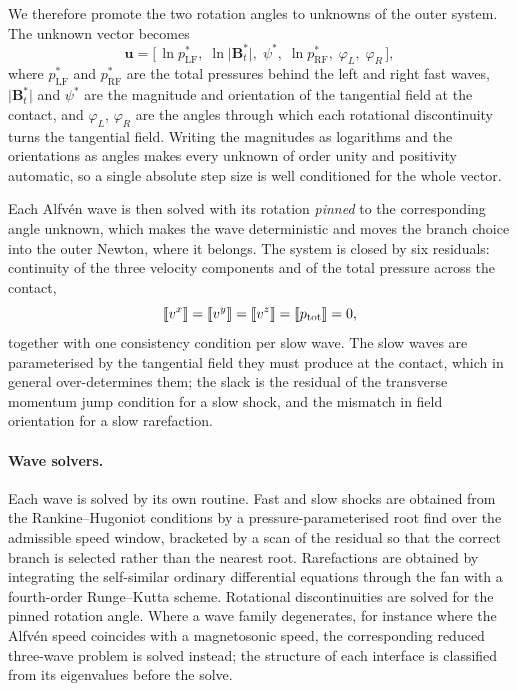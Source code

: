 We therefore promote the two rotation angles to unknowns of the outer system.
The unknown vector becomes
%
\begin{equation}
  \mathbf{u} = \bigl[\,\ln p^\ast_{\mathrm{LF}},\;
                      \ln \lvert \mathbf{B}_t^\ast \rvert,\;
                      \psi^\ast,\;
                      \ln p^\ast_{\mathrm{RF}},\;
                      \varphi_L,\; \varphi_R \,\bigr],
  \label{eq:unk6}
\end{equation}
%
where $p^\ast_{\mathrm{LF}}$ and $p^\ast_{\mathrm{RF}}$ are the total
pressures behind the left and right fast waves, $\lvert\mathbf{B}_t^\ast\rvert$
and $\psi^\ast$ are the magnitude and orientation of the tangential field at
the contact, and $\varphi_L$, $\varphi_R$ are the angles through which each
rotational discontinuity turns the tangential field. Writing the magnitudes as
logarithms and the orientations as angles makes every unknown of order unity
and positivity automatic, so a single absolute step size is well conditioned
for the whole vector.

Each Alfv\'en wave is then solved with its rotation \emph{pinned} to the
corresponding angle unknown, which makes the wave deterministic and moves the
branch choice into the outer Newton, where it belongs. The system is closed by
six residuals: continuity of the three velocity components and of the total
pressure across the contact,
%
\begin{equation}
  \llbracket v^x \rrbracket = \llbracket v^y \rrbracket =
  \llbracket v^z \rrbracket = \llbracket p_{\rm tot} \rrbracket = 0 ,
  \label{eq:cd}
\end{equation}
%
together with one consistency condition per slow wave. The slow waves are
parameterised by the tangential field they must produce at the contact, which
in general over-determines them; the slack is the residual of the transverse
momentum jump condition for a slow shock, and the mismatch in field
orientation for a slow rarefaction.

\paragraph{Wave solvers.}
Each wave is solved by its own routine. Fast and slow shocks are obtained from
the Rankine--Hugoniot conditions by a pressure-parameterised root find over
the admissible speed window, bracketed by a scan of the residual so that the
correct branch is selected rather than the nearest root. Rarefactions are
obtained by integrating the self-similar ordinary differential equations
through the fan with a fourth-order Runge--Kutta scheme. Rotational
discontinuities are solved for the pinned rotation angle. Where a wave family
degenerates, for instance where the Alfv\'en speed coincides with a
magnetosonic speed, the corresponding reduced three-wave problem is solved
instead; the structure of each interface is classified from its eigenvalues
before the solve.

